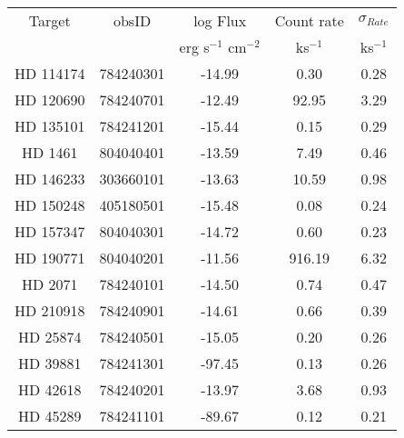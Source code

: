 \begin{table*}
\centering
\begin{tabular}{ccccc}
\hline \hline
Target & obsID & log Flux & Count rate & $\sigma_{Rate}$ \\
 &  & erg s$^{-1}$ cm$^{-2}$ & ks$^{-1}$ & ks$^{-1}$ \\
\hline
HD 114174 & 784240301 & -14.99 & 0.30 & 0.28 \\
HD 120690 & 784240701 & -12.49 & 92.95 & 3.29 \\
HD 135101 & 784241201 & -15.44 & 0.15 & 0.29 \\
HD 1461 & 804040401 & -13.59 & 7.49 & 0.46 \\
HD 146233 & 303660101 & -13.63 & 10.59 & 0.98 \\
HD 150248 & 405180501 & -15.48 & 0.08 & 0.24 \\
HD 157347 & 804040301 & -14.72 & 0.60 & 0.23 \\
HD 190771 & 804040201 & -11.56 & 916.19 & 6.32 \\
HD 2071 & 784240101 & -14.50 & 0.74 & 0.47 \\
HD 210918 & 784240901 & -14.61 & 0.66 & 0.39 \\
HD 25874 & 784240501 & -15.05 & 0.20 & 0.26 \\
HD 39881 & 784241301 & -97.45 & 0.13 & 0.26 \\
HD 42618 & 784240201 & -13.97 & 3.68 & 0.93 \\
HD 45289 & 784241101 & -89.67 & 0.12 & 0.21 \\
\hline
\end{tabular}
\end{table*}
